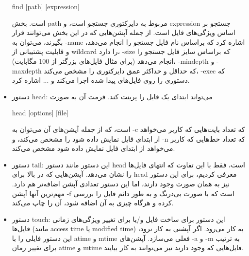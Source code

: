 \documentclass[12pt]{article}
\begin{document}
\begin{itemize}
            \begin{english}
                find [path] [expression]
            \end{english}

            است. بخش
            path
            مربوط به دایرکتوری جستجو است، و 
            expression
            جستجو بر اساس ویژگی‌های فایل است. از جمله آپشن‌هایی که در این بخش می‌توانند قرار بگیرند، می‌توان به 
            \textenglish{-name}
            اشاره کرد که براساس نام فایل جستجو را انجام می‌دهد، و قابلیت پشتیبانی از 
            wildcard
            را دارد، 
            \textenglish{-size}
            که براساس سایز فایل جستجو را انجام می‌دهد (برای مثال فایل‌های بزرگتر از 100 مگابایت)، 
            \textenglish{-mindepth}
            و
            \textenglish{-maxdepth}
            که حداقل و حداکثر عمق دایرکتوری را مشخص می‌کند، 
            \textenglish{-exec}
            که دستوری را روی فایل‌های پیدا شده اجرا می‌کند و ... اشاره کرد.

            \item دستور \textenglish{head}:
            \cite{gnu-coreutils-head}
            می‌تواند ابتدای یک فایل را پرینت کند. فرمت آن به صورت

            \begin{english}
                head [options] [file]
            \end{english}

            است، که از جمله آپشن‌های آن می‌توان به 
            \textenglish{-c}
            که تعداد بایت‌هایی که کاربر می‌خواهد از ابتدای فایل نمایش داده شود را مشخص می‌کند، و 
            \textenglish{-n}
            که تعداد خط‌هایی که کاربر می‌خواهد از ابتدای فایل نمایش داده شود مشخص می‌کند.

            \item دستور \textenglish{tail}:
            \cite{gnu-coreutils-tail}
            این دستور مانند دستور 
            head
            است، فقط با این تفاوت که انتهای فایل‌ها را نشان می‌دهد. آپشن‌هایی که در بالا برای 
            head
            معرفی کردیم، برای این دستور نیز به همان صورت وجود دارند، اما این دستور تعدادی آپشن اضافه‌تر هم دارد. مهم‌ترین آنها آپشن
            \textenglish{-f}
            است که با صورت بی‌درنگ و به طور دائم فایل را بررسی کرده و هرگاه چیزی به آن اضافه شود، آن را چاپ می‌کند.

            \item دستور \textenglish{touch}:
            \cite{gnu-coreutils-touch}
            این دستور برای ساخت فایل و/یا برای تغییر ویژگی‌های زمانی فایل‌ها (مانند 
            \textenglish{access time}
            یا
            \textenglish{modified time})
            به کار می‌رود. اگر آپشنی به کار نرود، این دستور فایلی را با 
            atime
            و
            mtime 
            فعلی می‌سازد. آپشن‌های
            \textenglish{-a}
            و
            \textenglish{-m}
            به ترتیب برای تغییر زمان
            atime
            و 
            mtime
            فایل‌هایی که وجود دارند نیز می‌توانند به کار بیایند.


\end{itemize}
\end{document}
